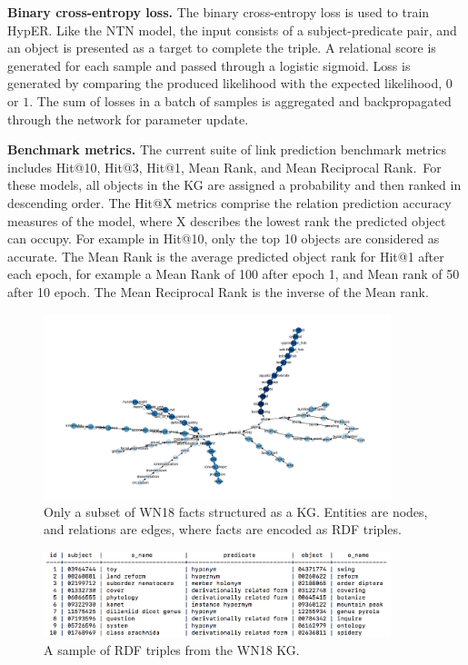 \noindent \textbf{Binary cross-entropy loss.} The binary cross-entropy loss is used to train HypER. Like the NTN model, the input consists of a subject-predicate pair, and an object is presented as a target to complete the triple. A relational score is generated for each sample and passed through a logistic sigmoid. Loss is generated by comparing the produced likelihood with the expected likelihood, $ 0 $ or $ 1 $. The sum of losses in a batch of samples is aggregated and backpropagated through the network for parameter update. \par

\noindent \textbf{Benchmark metrics.} The current suite of link prediction benchmark metrics includes Hit@10, Hit@3, Hit@1, Mean Rank, and Mean Reciprocal Rank.\ For these models, all objects in the KG are assigned a probability and then ranked in descending order. The Hit@X metrics comprise the relation prediction accuracy measures of the model, where X describes the lowest rank the predicted object can occupy. For example in Hit@10, only the top 10 objects are considered as accurate. The Mean Rank is the average predicted object rank for Hit@1 after each epoch, for example a Mean Rank of 100 after epoch 1, and Mean rank of 50 after 10 epoch. The Mean Reciprocal Rank is the inverse of the Mean rank. \par

\begin{figure}[H]
   	\centering
    	\includegraphics[width=0.9\textwidth, height=0.5\textwidth]{WN18_Graph}
	\captionsetup{justification=centering}
	\caption{Only a subset of WN18 facts structured as a KG. Entities are nodes, and relations are edges, where facts are encoded as RDF triples.}
\end{figure}

\begin{figure}[H]
   	\centering
    	\includegraphics[width=0.9\textwidth, height=0.3\textwidth]{wn18_fact_sample}
	\caption{A sample of RDF triples from the WN18 KG.}
\end{figure}

